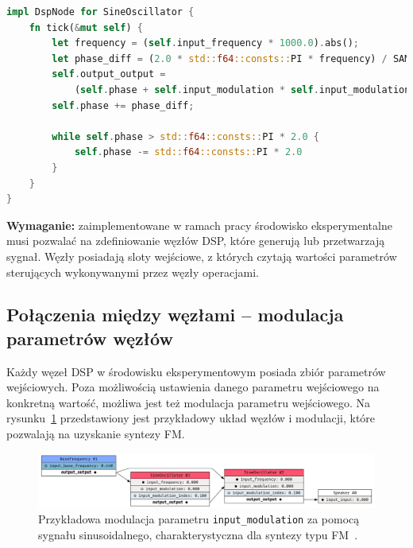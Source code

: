 \begin{lstlisting}[language=Rust, caption=Implementacja węzła SineOscillator.,label={lst:sine_fm}]
impl DspNode for SineOscillator {
    fn tick(&mut self) {
        let frequency = (self.input_frequency * 1000.0).abs();
        let phase_diff = (2.0 * std::f64::consts::PI * frequency) / SAMPLE_RATE;
        self.output_output =
            (self.phase + self.input_modulation * self.input_modulation_index * 10.0).sin();
        self.phase += phase_diff;

        while self.phase > std::f64::consts::PI * 2.0 {
            self.phase -= std::f64::consts::PI * 2.0
        }
    }
}
\end{lstlisting}

\noindent
\textbf{Wymaganie:} zaimplementowane w ramach pracy środowisko eksperymentalne musi pozwalać na zdefiniowanie węzłów DSP, które generują lub
przetwarzają sygnał. Węzły posiadają sloty wejściowe, z których czytają wartości parametrów sterujących wykonywanymi 
przez węzły operacjami.

\subsection{Połączenia między węzłami -- modulacja parametrów węzłów}\label{sec:modulation_requirements}

Każdy węzeł DSP w środowisku eksperymentowym posiada zbiór parametrów wejściowych. Poza możliwością
ustawienia danego parametru wejściowego na konkretną wartość, możliwa jest też modulacja parametru
wejściowego. Na rysunku~\ref{fig:fm_mod_example} przedstawiony jest przykładowy układ węzłów i modulacji,
które pozwalają na uzyskanie syntezy FM\@.

\begin{figure}[H]\label{fig:fm_mod_example}
    \centering
    \includegraphics[width=1.0\linewidth]{rys02/fm_mod_example.png}
    \caption{
      Przykładowa modulacja parametru \texttt{input\_modulation} za pomocą
      sygnału sinusoidalnego, charakterystyczna dla syntezy typu
      FM~\cite{computational_music_synthesis}.
    }
\end{figure}

